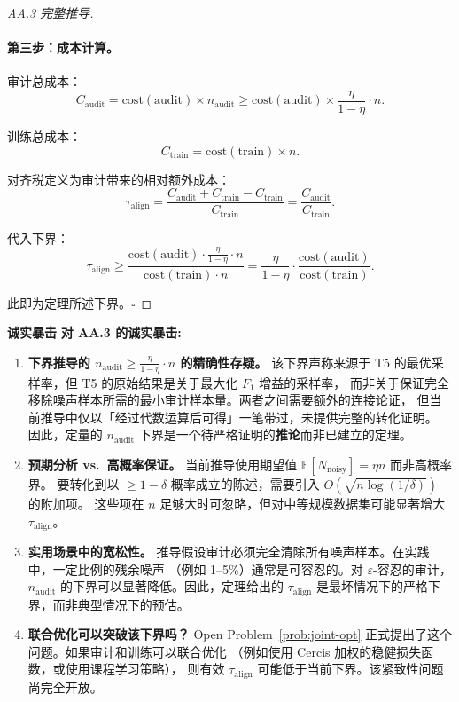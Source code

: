 \documentclass[12pt,a4paper]{article}
\newcommand{\critique}{\medskip\noindent\textbf{诚实暴击}\quad}
\newcommand{\E}{\mathbb{E}}
\begin{document}
\begin{proof}[AA.3 完整推导]
\paragraph{第三步：成本计算。}
审计总成本：
\[
C_{\mathrm{audit}} = \mathrm{cost}(\mathrm{audit}) \times n_{\mathrm{audit}}
\geq \mathrm{cost}(\mathrm{audit}) \times \frac{\eta}{1-\eta} \cdot n.
\]

训练总成本：
\[
C_{\mathrm{train}} = \mathrm{cost}(\mathrm{train}) \times n.
\]

对齐税定义为审计带来的相对额外成本：
\[
\tau_{\mathrm{align}} = \frac{C_{\mathrm{audit}} + C_{\mathrm{train}} - C_{\mathrm{train}}}{C_{\mathrm{train}}}
= \frac{C_{\mathrm{audit}}}{C_{\mathrm{train}}}.
\]

代入下界：
\[
\tau_{\mathrm{align}} \geq
\frac{\mathrm{cost}(\mathrm{audit}) \cdot \frac{\eta}{1-\eta} \cdot n}
     {\mathrm{cost}(\mathrm{train}) \cdot n}
= \frac{\eta}{1-\eta} \cdot \frac{\mathrm{cost}(\mathrm{audit})}{\mathrm{cost}(\mathrm{train})}.
\]

此即为定理所述下界。\hfill$\square$
\end{proof}

\critique
\textbf{对 AA.3 的诚实暴击:}

\begin{enumerate}
    \item \textbf{下界推导的 $n_{\mathrm{audit}} \geq \frac{\eta}{1-\eta}\cdot n$ 的精确性存疑。}
    该下界声称来源于 T5 的最优采样率，但 T5 的原始结果是关于最大化 $F_1$ 增益的采样率，
    而非关于保证完全移除噪声样本所需的最小审计样本量。两者之间需要额外的连接论证，
    但当前推导中仅以「经过代数运算后可得」一笔带过，未提供完整的转化证明。
    因此，定量的 $n_{\mathrm{audit}}$ 下界是一个待严格证明的\textbf{推论}而非已建立的定理。
    \item \textbf{预期分析 vs.\ 高概率保证。}
    当前推导使用期望值 $\E[N_{\mathrm{noisy}}] = \eta n$ 而非高概率界。
    要转化到以 $\geq 1-\delta$ 概率成立的陈述，需要引入 $O(\sqrt{n\log(1/\delta)})$ 的附加项。
    这些项在 $n$ 足够大时可忽略，但对中等规模数据集可能显著增大 $\tau_{\mathrm{align}}$。
    \item \textbf{实用场景中的宽松性。}
    推导假设审计必须完全清除所有噪声样本。在实践中，一定比例的残余噪声
    （例如 1--5\%）通常是可容忍的。对 $\varepsilon$-容忍的审计，
    $n_{\mathrm{audit}}$ 的下界可以显著降低。因此，定理给出的 $\tau_{\mathrm{align}}$
    是最坏情况下的严格下界，而非典型情况下的预估。
    \item \textbf{联合优化可以突破该下界吗？}
    Open Problem~\ref{prob:joint-opt} 正式提出了这个问题。如果审计和训练可以联合优化
    （例如使用 Cercis 加权的稳健损失函数，或使用课程学习策略），
    则有效 $\tau_{\mathrm{align}}$ 可能低于当前下界。该紧致性问题尚完全开放。
\end{enumerate}
\end{document}
